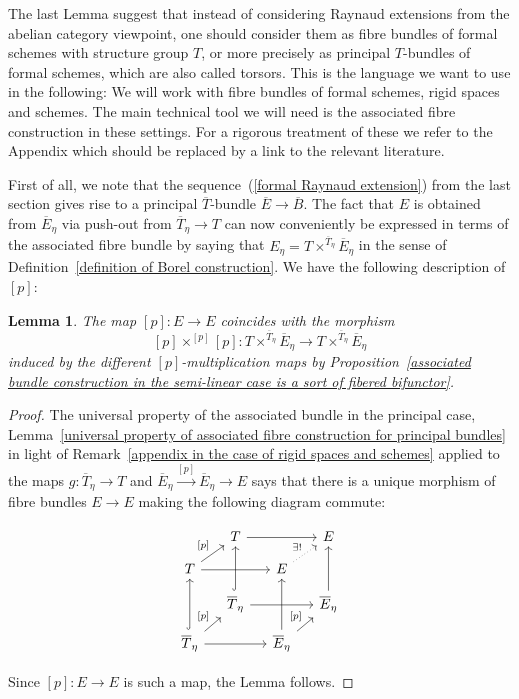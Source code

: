 \documentclass[11pt,oneside]{amsart}
\newtheorem{lemma}[theorem]{Lemma}
\theoremstyle{definition}
\theoremstyle{remark}
\begin{document}
	The last Lemma suggest that instead of considering Raynaud extensions from the abelian category viewpoint, one should consider them as fibre bundles of formal schemes with structure group $T$, or more precisely as principal $T$-bundles of formal schemes, which are also called torsors. This is the language we want to use in the following: We will work with fibre bundles of formal schemes, rigid spaces and schemes. The main technical tool we will need is the associated fibre construction in these settings. For a rigorous  treatment of these we refer to the Appendix {\color{red} which should be replaced by a link to the relevant literature}.
	
	First of all, we note that the sequence~(\ref{formal Raynaud extension}) from the last section gives rise to a principal $\overline{T}$-bundle
	$\overline{E}\rightarrow \overline{B}$. The fact that $E$ is obtained from $\overline{E}_\eta$ via push-out from $\overline{T}_\eta\rightarrow T$ can now conveniently be expressed in terms of the associated fibre bundle by saying that $E_\eta = T\times^{\overline{T}_\eta}\overline{E}_\eta$ in the sense of Definition~\ref{definition of Borel construction}. We have the following description of $[p]$:
	\begin{lemma}\label{p-multiplication is induced from Borel construction}
		The map $[p]:E\rightarrow E$ coincides with the morphism 
		\[[p]\times^{[p]}[p]: T\times^{\overline{T}_\eta}\overline{E}_\eta\rightarrow T\times^{\overline{T}_\eta}\overline{E}_\eta\]
		induced by the different $[p]$-multiplication maps by Proposition~\ref{associated bundle construction in the semi-linear case is a sort of fibered bifunctor}.
	\end{lemma}
	\begin{proof}
		The universal property of the associated bundle in the principal case, Lemma~\ref{universal property of associated fibre construction for principal bundles} in light of Remark~\ref{appendix in the case of rigid spaces and schemes} applied to the maps $g:\overline{T}_\eta\rightarrow T$ and $\overline{E}_\eta\xrightarrow{[p]} \overline{E}_\eta\rightarrow E$ says that there is a unique morphism of fibre bundles $E\rightarrow E$ making the following diagram commute:
		\begin{center}
			\begin{equation}\label{rigid p-multiplication cube}
			\begin{tikzcd}[row sep = small, column sep = small]
				& T \arrow[rr] &  & E \\
				T \arrow[ru, "{[p]}"] \arrow[rr,crossing over] &  & E \arrow[ru, "\exists!", dotted] &  \\
				& \overline{T}_\eta \arrow[uu, hook] \arrow[rr,crossing over] &  & \overline{E}_\eta \arrow[uu] \\
				\overline{T}_\eta \arrow[ru, "{[p]}"] \arrow[uu, hook] \arrow[rr] &  & \overline{E}_\eta \arrow[ru, "{[p]}"] \arrow[uu] & 
			\end{tikzcd}
			\end{equation}
		\end{center}
		Since $[p]:E\rightarrow E$ is such a map, the Lemma follows.
	\end{proof}
	
\end{document}
